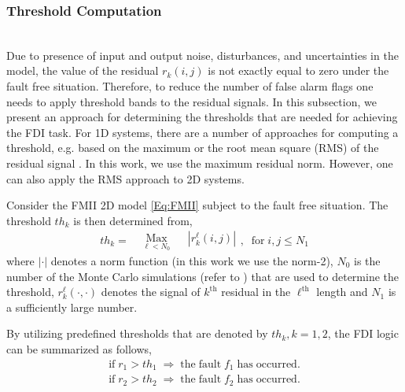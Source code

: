 \documentclass[journal,12pt,draftcls,onecolumn]{IEEEtran}
\begin{document}
\subsubsection{Threshold Computation}\ \\
Due to presence of input and output noise, disturbances, and uncertainties in the model, the value of the residual $r_k(i,j)$ is not exactly equal to zero under the fault free situation.
Therefore, to reduce the number of false alarm flags one needs to apply threshold bands to the residual signals. In this subsection, we present an approach for determining  the thresholds that are needed for achieving the FDI task. For 1D systems, there are a number of approaches for computing a threshold, e.g. based on the maximum or the root mean square (RMS) of the residual signal \cite{ThresholdCal}. In this work, we use the maximum residual norm. However, one can also apply the RMS approach to 2D systems.

Consider the FMII 2D model \eqref{Eq:FMII} subject to the fault free situation. The threshold $th_k$ is then determined from,
\begin{equation}
th_k = \begin{aligned}
& \underset{\ell<N_0}{\text{Max}}
& & |r_k^\ell(i,j)|
\end{aligned}, \;\; \mathrm{for}\; i,j\leq N_1
\end{equation}
where $|\cdot|$ denotes a norm function (in this work we use the norm-2), $N_0$ is the number of the Monte Carlo simulations (refer to \cite{MonteCarloBook}) that are used to determine the threshold, $r_k^\ell(\cdot,\cdot)$ denotes the signal of $k^{\mathrm{th}}$ residual in the $\ell^{\mathrm{th}}$ length and $N_1$ is a sufficiently large number.

By utilizing  predefined thresholds that are denoted by $th_k, k=1,2$, the FDI logic can be summarized as follows,
\begin{equation}\label{Eq:FDILogic}
\begin{split}
\mathrm{if}\;r_1 >th_1 \; \Rightarrow \; \mathrm{the\;fault}\; f_1\;\mathrm{has\;occurred}.\\
\mathrm{if}\;r_2 >th_2 \; \Rightarrow \; \mathrm{the\;fault}\; f_2\;\mathrm{has\;occurred}.\\
\end{split}
\end{equation}
\end{document}
